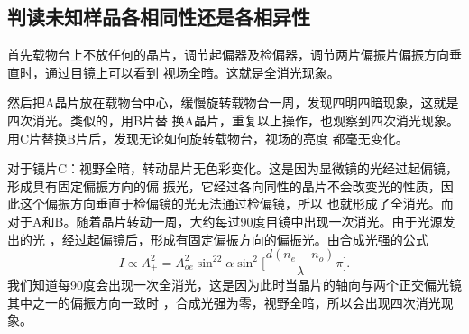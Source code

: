 \documentclass[11pt,a4paper]{article}
\begin{document}
\begin{spacing}{1.3}
\begin{CJK*}{UTF8}{gbsn}
\subsection{判读未知样品各相同性还是各相异性}
首先载物台上不放任何的晶片，调节起偏器及检偏器，调节两片偏振片偏振方向垂直时，通过目镜上可以看到
视场全暗。这就是全消光现象。 \par 
然后把A晶片放在载物台中心，缓慢旋转载物台一周，发现四明四暗现象，这就是四次消光。类似的，用B片替
换A晶片，重复以上操作，也观察到四次消光现象。用C片替换B片后，发现无论如何旋转载物台，视场的亮度
都毫无变化。\par 
对于镜片C：视野全暗，转动晶片无色彩变化。这是因为显微镜的光经过起偏镜，形成具有固定偏振方向的偏
振光，它经过各向同性的晶片不会改变光的性质，因此这个偏振方向垂直于检偏镜的光无法通过检偏镜，所以
也就形成了全消光。而对于A和B。随着晶片转动一周，大约每过90度目镜中出现一次消光。由于光源发出的光
，经过起偏镜后，形成有固定偏振方向的偏振光。由合成光强的公式
\begin{equation}
I\propto A_+^2= A_{oe}^2\sin^22\alpha\sin^2\big[\frac{d(n_e-n_o)}{\lambda}\pi\big].
\end{equation}
我们知道每90度会出现一次全消光，这是因为此时当晶片的轴向与两个正交偏光镜其中之一的偏振方向一致时
，合成光强为零，视野全暗，所以会出现四次消光现象。


\end{CJK*}
\end{spacing}
\end{document}
